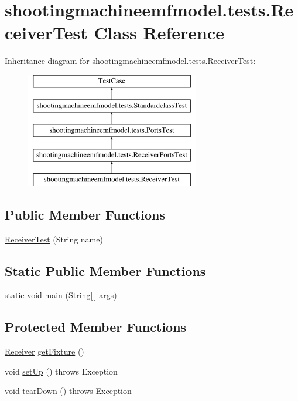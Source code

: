 \hypertarget{classshootingmachineemfmodel_1_1tests_1_1_receiver_test}{\section{shootingmachineemfmodel.\-tests.\-Receiver\-Test Class Reference}
\label{classshootingmachineemfmodel_1_1tests_1_1_receiver_test}
}
Inheritance diagram for shootingmachineemfmodel.\-tests.\-Receiver\-Test\-:\begin{figure}[H]
\begin{center}
\leavevmode
\includegraphics[height=5.000000cm]{classshootingmachineemfmodel_1_1tests_1_1_receiver_test}
\end{center}
\end{figure}
\subsection*{Public Member Functions}
\begin{DoxyCompactItemize}
\item 
\hyperlink{classshootingmachineemfmodel_1_1tests_1_1_receiver_test_af7f581e8d1d39be1e07564e1d51ac353}{Receiver\-Test} (String name)
\end{DoxyCompactItemize}
\subsection*{Static Public Member Functions}
\begin{DoxyCompactItemize}
\item 
static void \hyperlink{classshootingmachineemfmodel_1_1tests_1_1_receiver_test_aa4356df22e49cb03dcca02e37b90321b}{main} (String\mbox{[}$\,$\mbox{]} args)
\end{DoxyCompactItemize}
\subsection*{Protected Member Functions}
\begin{DoxyCompactItemize}
\item 
\hyperlink{interfaceshootingmachineemfmodel_1_1_receiver}{Receiver} \hyperlink{classshootingmachineemfmodel_1_1tests_1_1_receiver_test_a6f74bffdefadc0663d75c3a90848e80a}{get\-Fixture} ()
\item 
void \hyperlink{classshootingmachineemfmodel_1_1tests_1_1_receiver_test_a62640f959676e062c03d4b2d3abd8246}{set\-Up} ()  throws Exception 
\item 
void \hyperlink{classshootingmachineemfmodel_1_1tests_1_1_receiver_test_ab39911a81d50f8ff46a782c9e9d6b0c6}{tear\-Down} ()  throws Exception 
\end{DoxyCompactItemize}
